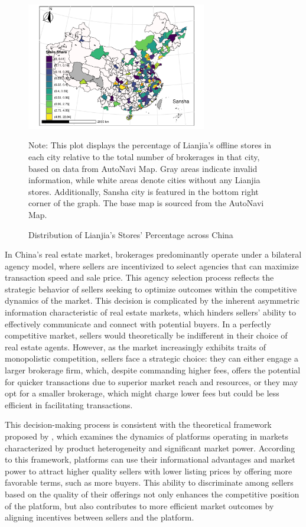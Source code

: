\documentclass[11pt]{article}
\begin{document}
\begin{figure}[H]
  \centering
  \includegraphics[width=0.7\textwidth]{../figures/distribution_of_cities_share.pdf}
  \caption{Distribution of Lianjia's Stores' Percentage across China}
  \label{fig:precise_proportion_contraction}
  Note: This plot displays the percentage of Lianjia's offline stores in each city relative to the total number of brokerages in that city, based on data from AutoNavi Map. Gray areas indicate invalid information, while white areas denote cities without any Lianjia stores. Additionally, Sansha city is featured in the bottom right corner of the graph. The base map is sourced from the AutoNavi Map.
\end{figure}

In China's real estate market, brokerages predominantly operate under a bilateral agency model, where sellers are incentivized to select agencies that can maximize transaction speed and sale price. This agency selection process reflects the strategic behavior of sellers seeking to optimize outcomes within the competitive dynamics of the market. This decision is complicated by the inherent asymmetric information characteristic of real estate markets, which hinders sellers' ability to effectively communicate and connect with potential buyers. In a perfectly competitive market, sellers would theoretically be indifferent in their choice of real estate agents. However, as the market increasingly exhibits traits of monopolistic competition, sellers face a strategic choice: they can either engage a larger brokerage firm, which, despite commanding higher fees, offers the potential for quicker transactions due to superior market reach and resources, or they may opt for a smaller brokerage, which might charge lower fees but could be less efficient in facilitating transactions.

This decision-making process is consistent with the theoretical framework proposed by \citep{bergemann_data_2024}, which examines the dynamics of platforms operating in markets characterized by product heterogeneity and significant market power. According to this framework, platforms can use their informational advantages and market power to attract higher quality sellers with lower listing prices by offering more favorable terms, such as more buyers. This ability to discriminate among sellers based on the quality of their offerings not only enhances the competitive position of the platform, but also contributes to more efficient market outcomes by aligning incentives between sellers and the platform.
\end{document}
